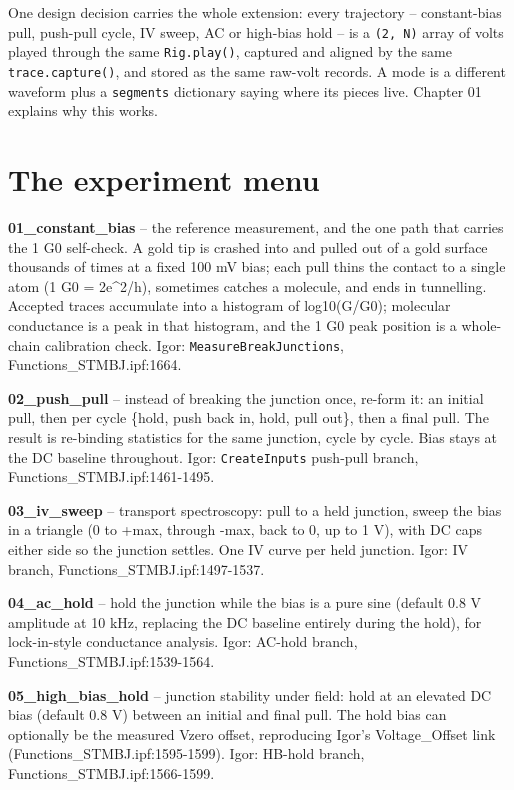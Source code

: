One design decision carries the whole extension: every trajectory -- constant-bias pull, push-pull cycle, IV sweep, AC or high-bias hold -- is a \texttt{(2,\discretionary{}{}{} N)} array of volts played through the same \texttt{Rig.\discretionary{}{}{}play()}, captured and aligned by the same \texttt{trace.\discretionary{}{}{}capture()}, and stored as the same raw-volt records. A mode is a different waveform plus a \texttt{segments} dictionary saying where its pieces live. Chapter 01 explains why this works.

\section{The experiment menu}

\textbf{01\_constant\_bias} -- the reference measurement, and the one path that carries the 1 G0 self-check. A gold tip is crashed into and pulled out of a gold surface thousands of times at a fixed 100 mV bias; each pull thins the contact to a single atom (1 G0 = 2e\textasciicircum{}2/h), sometimes catches a molecule, and ends in tunnelling. Accepted traces accumulate into a histogram of log10(G/G0); molecular conductance is a peak in that histogram, and the 1 G0 peak position is a whole-chain calibration check. Igor: \texttt{Measure\discretionary{}{}{}Break\discretionary{}{}{}Junctions}, Functions\_STMBJ.ipf:1664.

\textbf{02\_push\_pull} -- instead of breaking the junction once, re-form it: an initial pull, then per cycle \{hold, push back in, hold, pull out\}, then a final pull. The result is re-binding statistics for the same junction, cycle by cycle. Bias stays at the DC baseline throughout. Igor: \texttt{Create\discretionary{}{}{}Inputs} push-pull branch, Functions\_STMBJ.ipf:1461-1495.

\textbf{03\_iv\_sweep} -- transport spectroscopy: pull to a held junction, sweep the bias in a triangle (0 to +max, through -max, back to 0, up to 1 V), with DC caps either side so the junction settles. One IV curve per held junction. Igor: IV branch, Functions\_STMBJ.ipf:1497-1537.

\textbf{04\_ac\_hold} -- hold the junction while the bias is a pure sine (default 0.8 V amplitude at 10 kHz, replacing the DC baseline entirely during the hold), for lock-in-style conductance analysis. Igor: AC-hold branch, Functions\_STMBJ.ipf:1539-1564.

\textbf{05\_high\_bias\_hold} -- junction stability under field: hold at an elevated DC bias (default 0.8 V) between an initial and final pull. The hold bias can optionally be the measured Vzero offset, reproducing Igor's Voltage\_Offset link (Functions\_STMBJ.ipf:1595-1599). Igor: HB-hold branch, Functions\_STMBJ.ipf:1566-1599.

